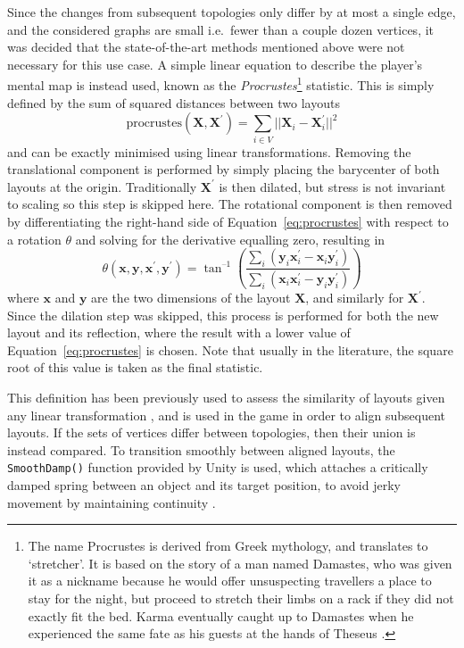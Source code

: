 Since the changes from subsequent topologies only differ by at most a single edge, and the considered graphs are small i.e.\ fewer than a couple dozen vertices, it was decided that the state-of-the-art methods mentioned above were not necessary for this use case. A simple linear equation to describe the player's mental map is instead used, known as the \emph{Procrustes}\footnote{The name Procrustes is derived from Greek mythology, and translates to `stretcher'. It is based on the story of a man named Damastes, who was given it as a nickname because he would offer unsuspecting travellers a place to stay for the night, but proceed to stretch their limbs on a rack if they did not exactly fit the bed. Karma eventually caught up to Damastes when he experienced the same fate as his guests at the hands of Theseus \cite{Cox2000}.} statistic.
This is simply defined by the sum of squared distances between two layouts
\begin{equation}
  \mathrm{procrustes}(\mathbf{X}, \mathbf{X}^\prime) = \sum_{i\in V} ||\mathbf{X}_i - \mathbf{X}_i^\prime||^2
  \label{eq:procrustes}
\end{equation}
and can be exactly minimised using linear transformations.
Removing the translational component is performed by simply placing the barycenter of both layouts at the origin. Traditionally $\mathbf{X}^\prime$ is then dilated, but stress is not invariant to scaling so this step is skipped here. The rotational component is then removed by differentiating the right-hand side of Equation~\eqref{eq:procrustes} with respect to a rotation $\theta$ and solving for the derivative equalling zero, resulting in
\begin{equation}
  \theta(\mathbf{x},\mathbf{y}, \mathbf{x^\prime}, \mathbf{y^\prime}) = 
  \tan^{\text{--}1}\left(\frac{\sum_i(\mathbf{y}_i\mathbf{x}^\prime_i-\mathbf{x}_i\mathbf{y}^\prime_i)}{\sum_i(\mathbf{x}_i\mathbf{x}^\prime_i-\mathbf{y}_i\mathbf{y}^\prime_i)}\right)
\end{equation}
where $\mathbf{x}$ and $\mathbf{y}$ are the two dimensions of the layout $\mathbf{X}$, and similarly for $\mathbf{X}^\prime$. Since the dilation step was skipped, this process is performed for both the new layout and its reflection, where the result with a lower value of Equation~\eqref{eq:procrustes} is chosen. Note that usually in the literature, the square root of this value is taken as the final statistic.

This definition has been previously used to assess the similarity of layouts given any linear transformation \cite{Ortmann2017}, and is used in the game in order to align subsequent layouts. If the sets of vertices differ between topologies, then their union is instead compared.
To transition smoothly between aligned layouts, the \texttt{SmoothDamp()} function provided by Unity is used, which attaches a critically damped spring between an object and its target position, to avoid jerky movement by maintaining continuity \cite{Kirmse2004}.

